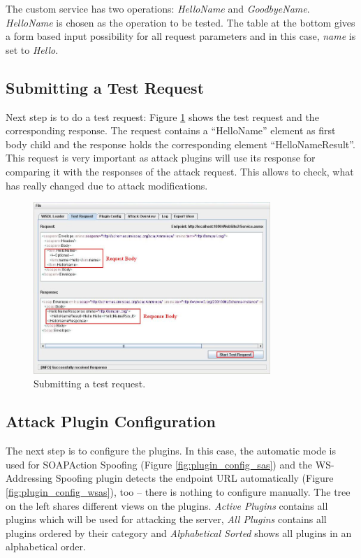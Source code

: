 The custom service has two operations: \emph{HelloName} and \emph{GoodbyeName}.
\emph{HelloName} is chosen as the operation to be tested. The table at the bottom gives a
form based input possibility for all request parameters and in this case, \emph{name} is set to
\emph{Hello}.

\subsection{Submitting a Test Request}
\label{sec:submitting_a_test_request}

Next step is to do a test request: Figure \ref{fig:test_request} shows
the test request and the corresponding response. The request contains a
\enquote{HelloName} element as first body child and the response holds the
corresponding element \enquote{HelloNameResult}. This request is very important
as attack plugins will use its response for comparing it with the responses of
the attack request. This allows to check, what has really changed due to attack
modifications. 

\begin{figure}[h!]
    \begin{center}
        \includegraphics[width=0.8\textwidth]{img/test_request}
    \end{center}
    \caption{Submitting a test request.}
    \label{fig:test_request}
\end{figure}

\subsection{Attack Plugin Configuration}
\label{sec:attack_plugin_configuration}

The next step is to configure the plugins. In this case, the automatic mode is
used for SOAPAction Spoofing (Figure \ref{fig:plugin_config_sas}) and
the WS-Addressing Spoofing plugin detects the endpoint URL automatically
(Figure \ref{fig:plugin_config_wsas}), too -- there is nothing to
configure manually. The tree on the left shares different views on the plugins.
\emph{Active Plugins} contains all plugins which will be used for attacking the
server, \emph{All Plugins} contains all plugins ordered by their category and
\emph{Alphabetical Sorted} shows all plugins in an alphabetical order.

